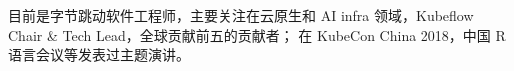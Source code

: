 

\begin{cvparagraph}
\begin{minipage}[t]{\textwidth}
目前是字节跳动软件工程师，主要关注在云原生和 AI infra 领域，Kubeflow Chair \& Tech Lead，全球贡献前五的贡献者；
在 KubeCon China 2018，中国 R 语言会议等发表过主题演讲。
\end{minipage}
\end{cvparagraph}

